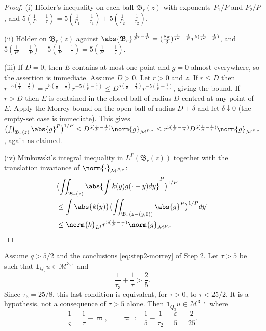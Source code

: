 \documentclass[11pt,reqno]{amsart}
\begin{document}
\begin{proof}
(i) H\"older's inequality on each ball $\mathfrak{B}_{r}(z)$ with exponents
$P_{1}/P$ and $P_{2}/P$, and
$5(\tfrac1P-\tfrac1\tau)=5(\tfrac1{P_{1}}-\tfrac1{\tau_{1}})
 +5(\tfrac1{P_{2}}-\tfrac1{\tau_{2}})$.

(ii) H\"older on $\mathfrak{B}_{r}(z)$ against
$\abs{\mathfrak{B}_{r}}^{\frac1{P'}-\frac1P}
 =(\tfrac{8\pi}{3})^{\frac1{P'}-\frac1P}r^{5(\frac1{P'}-\frac1P)}$, and
$5(\tfrac1{P'}-\tfrac1P)+5(\tfrac1P-\tfrac1\tau)=5(\tfrac1{P'}-\tfrac1\tau)$.

(iii) If $D=0$, then $E$ contains at most one point and $g=0$ almost
everywhere, so the assertion is immediate. Assume $D>0$.
Let $r>0$ and $z$. If $r\le D$ then
$r^{-5(\frac1P-\frac1\varkappa)}=r^{5(\frac1\varkappa-\frac1\tau)}
 r^{-5(\frac1P-\frac1\tau)}\le D^{5(\frac1\varkappa-\frac1\tau)}
 r^{-5(\frac1P-\frac1\tau)}$, giving the bound. If $r>D$ then
$E$ is contained in the closed ball of radius $D$ centred at any point
of $E$. Apply the Morrey bound on the open ball of radius $D+\delta$
and let $\delta\downarrow0$ (the empty-set case is immediate). This gives
$\bigl(\iint_{\mathfrak{B}_{r}(z)}\abs{g}^{P}\bigr)^{1/P}
 \le D^{5(\frac1P-\frac1\tau)}\norm{g}_{\mathcal{M}^{P,\tau}}
 \le r^{5(\frac1P-\frac1\varkappa)}D^{5(\frac1\varkappa-\frac1\tau)}
    \norm{g}_{\mathcal{M}^{P,\tau}}$, again as claimed.

(iv) Minkowski's integral inequality in $L^{P}(\mathfrak{B}_{r}(z))$ together
with the translation invariance of $\norm{\cdot}_{\mathcal{M}^{P,\tau}}$:
\[
\begin{aligned}
&\bigl(\iint_{\mathfrak{B}_{r}(z)}\abs{\int k(y)g(\cdot-y)dy}^{P}\bigr)^{1/P}
\\ &\le\int\abs{k(y)}\bigl(\iint_{\mathfrak{B}_{r}(z-(y,0))}\abs{g}^{P}\bigr)^{1/P}dy
\\ &\le\norm{k}_{L^{1}}r^{5(\frac1P-\frac1\tau)}\norm{g}_{\mathcal{M}^{P,\tau}}
\end{aligned}
.
\]
\end{proof}

\begin{proposition}\label{prop:bootstrap}
Assume $q>5/2$ and the conclusions \eqref{eq:step2-morrey} of Step 2.
Let $\tau>5$ be such that
$\mathbf{1}_{Q_{2}}u\in\mathcal{M}^{3,\tau}$ and
\begin{equation}\label{eq:bootstrap-cond}
  \frac1{\tau_{3}}+\frac1\tau>\frac25 .
\end{equation}
Since $\tau_3=25/8$, this last condition is equivalent, for $\tau>0$,
to $\tau<25/2$. It is a hypothesis, not a consequence of $\tau>5$ alone.
Then $\mathbf{1}_{Q_{3}}u\in\mathcal{M}^{3,\varsigma}$ where
\begin{equation}\label{eq:bootstrap-gain}
  \frac1\varsigma=\frac1\tau-\varpi,
  \qquad \varpi:=\frac15-\frac1{\tau_{2}}=\frac{\varepsilon}{5}=\frac2{25}.
\end{equation}
\end{proposition}
\end{document}
